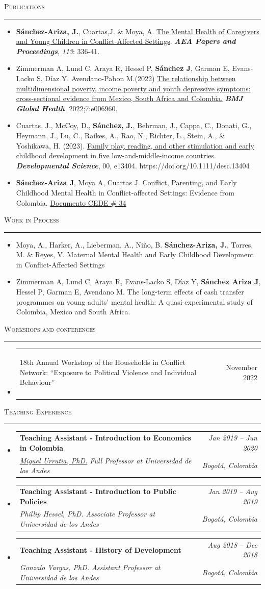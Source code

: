 \documentclass[11pt,letterpaper]{article}
\makeatletter
\newcommand{\cvsection}[1]{%
  \vspace{11pt}%
  {\Large\scshape #1\par}%
  \vspace{3pt}\hrule\vspace{6pt}%
}
\newcommand{\entryliststart}{%
  \begin{itemize}[leftmargin=0.15in,label={},topsep=0pt,partopsep=0pt,
                  itemsep=0pt,parsep=0pt]
}
\newcommand{\entrylistend}{\end{itemize}}
\newcommand{\cventry}[4]{%
  \item
  \begin{tabular*}{0.97\textwidth}[t]{@{}p{0.71\textwidth}@{\extracolsep{\fill}}r@{}}
    {\raggedright\large\bfseries #1} & {\large #2} \\
    {\raggedright\itshape #3} & {\itshape #4} \\
  \end{tabular*}\vspace{5pt}%
}
\newcommand{\cvtextliststart}{%
  \begin{itemize}[leftmargin=0.15in,label={},topsep=0pt,partopsep=0pt,
                  itemsep=0pt,parsep=0pt]
}
\newcommand{\cvtextitem}[1]{\item #1\vspace{3pt}}
\newcommand{\cvtextlistend}{\end{itemize}}
\makeatother
\begin{document}
\cvsection{Publications}
\cvtextliststart
  \cvtextitem{\textbf{S\'anchez-Ariza, J.}, Cuartas,J. \& Moya, A. \href{https://www.aeaweb.org/articles?id=10.1257/pandp.20231017}{The Mental Health of Caregivers and Young Children in Conflict-Affected Settings}. \textbf{\textit{AEA Papers and Proceedings}}, \textit{113}: 336-41.}
  \cvtextitem{Zimmerman A, Lund C, Araya R, Hessel P, \textbf{S\'anchez J}, Garman E, Evans-Lacko S, D\'iaz Y, Avendano-Pabon M.(2022) \href{https://gh.bmj.com/content/7/1/e006960}{The relationship between multidimensional poverty, income poverty and youth depressive symptoms: cross-sectional evidence from Mexico, South Africa and Colombia.} \textbf{\textit{BMJ Global Health}} .2022;7:e006960.}
  \cvtextitem{Cuartas, J., McCoy, D., \textbf{S\'anchez, J.}, Behrman, J., Cappa, C., Donati, G., Heymann, J., Lu, C., Raikes, A., Rao, N., Richter, L., Stein, A., \& Yoshikawa, H. (2023). \href{https://pubmed.ncbi.nlm.nih.gov/37114644/}{Family play, reading, and other stimulation and early childhood development in five low-and-middle-income countries.} \textbf{\textit{Developmental Science}}, 00, e13404. https://doi.org/10.1111/desc.13404}
\cvtextlistend

\newpage
\cvtextliststart
  \cvtextitem{\textbf{S\'anchez-Ariza J}, Moya A, Cuartas J. Conflict, Parenting, and Early Childhood Mental Health in Conflict-affected Settings: Evidence from Colombia. \href{https://papers.ssrn.com/sol3/papers.cfm?abstract_id=4230362}{Documento CEDE \# 34}}
\cvtextlistend

\cvsection{Work in Process}
\cvtextliststart
  \cvtextitem{Moya, A., Harker, A., Lieberman, A., Ni\~no, B. \textbf{S\'anchez-Ariza, J.}, Torres, M. \& Reyes, V. Maternal Mental Health and Early Childhood Development in Conflict-Affected Settings}
  \cvtextitem{Zimmerman A, Lund C, Araya R, Evans-Lacko S, D\'iaz Y, \textbf{S\'anchez Ariza J}, Hessel P, Garman E, Avendano M. The long-term effects of cash transfer programmes on young adults' mental health: A quasi-experimental study of Colombia, Mexico and South Africa.}
\cvtextlistend

\cvsection{Workshops and conferences}
\entryliststart
  \cventry{\parbox[t]{411pt}{\raggedright 18th Annual Workshop of the Households in Conflict Network: ``Exposure to Political Violence and Individual Behaviour''}}
    {November 2022}
    {}
    {}
\entrylistend

\cvsection{Teaching Experience}
\entryliststart
  \cventry{Teaching Assistant - Introduction to Economics in Colombia}{\textit{Jan 2019 -- Jun 2020}}
    {\href{https://economia.uniandes.edu.co/profesores/miguel-urrutia}{Miguel Urrutia, PhD.} Full Professor at Universidad de los Andes}
    {Bogot\'a, Colombia}
  \cventry{Teaching Assistant - Introduction to Public Policies}{\textit{Jan 2019 -- Aug 2019}}
    {Phillip Hessel, PhD. Associate Professor at Universidad de los Andes}
    {Bogot\'a, Colombia}
  \cventry{Teaching Assistant - History of Development}{\textit{Aug 2018 -- Dec 2018}}
    {Gonzalo Vargas, PhD. Assistant Professor at Universidad de los Andes}
    {Bogot\'a, Colombia}
\entrylistend
\end{document}
